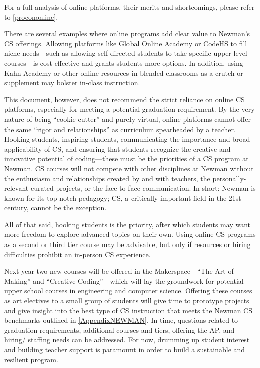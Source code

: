 For a full analysis of online platforms, their merits and shortcomings, please refer to \ref{procononline}.\par
There are several examples where online programs add clear value to Newman's CS offerings. Allowing platforms like Global Online Academy or CodeHS to fill niche needs---such as allowing self-directed students to take specific upper level courses---is cost-effective and grants students more options. In addition, using Kahn Academy or other online resources in blended classrooms as a crutch or supplement may bolster in-class instruction.\par
This document, however, does not recommend the strict reliance on online CS platforms, especially for meeting a potential graduation requirement. By the very nature of being ``cookie cutter'' and purely virtual, online platforms cannot offer the same ``rigor and relationships'' as curriculum spearheaded by a teacher. Hooking students, inspiring students, communicating the importance and broad applicability of CS, and ensuring that students recognize the creative and innovative potential of coding---these must be the priorities of a CS program at Newman. CS courses will not compete with other disciplines at Newman without the enthusiasm and relationships created by and with teachers, the personally-relevant curated projects, or the face-to-face communication. In short: Newman is known for its top-notch pedagogy; CS, a critically important field in the 21st century, cannot be the exception. \par
All of that said, hooking students is the priority, after which students may want more freedom to explore advanced topics on their own. Using online CS programs as a second or third tier course may be advisable, but only if resources or hiring difficulties prohibit an in-person CS experience. \par  

Next year two new courses will be offered in the Makerspace---``The Art of Making'' and ``Creative Coding''---which will lay the groundwork for potential upper school courses in engineering and computer science. Offering these courses as art electives to a small group of students will give time to prototype projects and give insight into the best type of CS instruction that meets the Newman CS benchmarks outlined in \ref{AppendixNEWMAN}. In time, questions related to graduation requirements, additional courses and tiers, offering the AP, and hiring/ staffing needs can be addressed. For now, drumming up student interest and building teacher support is paramount in order to build a sustainable and resilient program.
